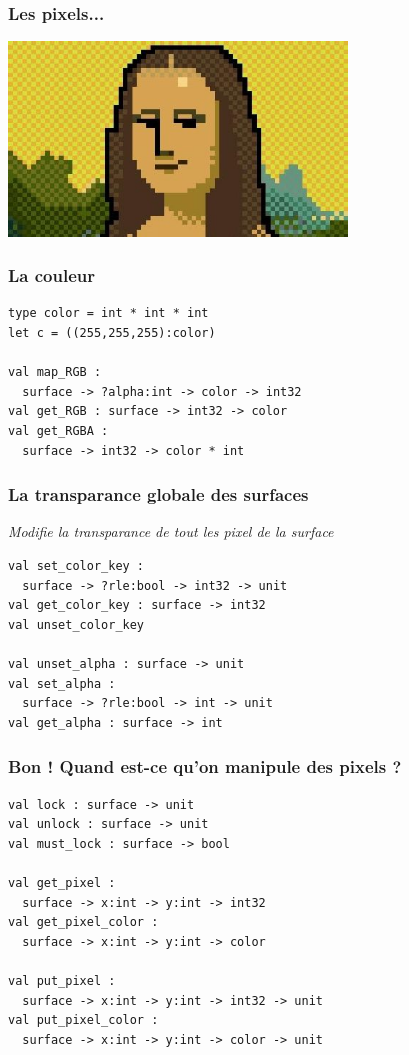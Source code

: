 \begin{frame}
	\frametitle{Les pixels...}
	\begin{center}
		\includegraphics[width=9cm]{pics/Joconde-pixel.jpg}
	\end{center}
\end{frame}

\begin{frame}[fragile]
	\frametitle{La couleur}
	\begin{lstlisting}
type color = int * int * int
let c = ((255,255,255):color)

val map_RGB : 
  surface -> ?alpha:int -> color -> int32
val get_RGB : surface -> int32 -> color
val get_RGBA : 
  surface -> int32 -> color * int
	\end{lstlisting}
\end{frame}

\begin{frame}[fragile]
	\frametitle{La transparance \textbf{globale} des surfaces}
	\textit{Modifie la transparance de tout les pixel de la surface}
	\begin{lstlisting}
val set_color_key : 
  surface -> ?rle:bool -> int32 -> unit
val get_color_key : surface -> int32
val unset_color_key

val unset_alpha : surface -> unit
val set_alpha : 
  surface -> ?rle:bool -> int -> unit
val get_alpha : surface -> int
	\end{lstlisting}
\end{frame}

\begin{frame}[fragile]
	\frametitle{\og{}Bon ! Quand est-ce qu'on manipule des pixels ?\fg}
	\begin{lstlisting}
val lock : surface -> unit
val unlock : surface -> unit
val must_lock : surface -> bool

val get_pixel : 
  surface -> x:int -> y:int -> int32
val get_pixel_color : 
  surface -> x:int -> y:int -> color

val put_pixel : 
  surface -> x:int -> y:int -> int32 -> unit
val put_pixel_color : 
  surface -> x:int -> y:int -> color -> unit
	\end{lstlisting}
\end{frame}

